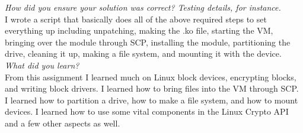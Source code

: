 \documentclass[letterpaper,10pt,titlepage]{article}
\begin{document}
\textit{How did you ensure your solution was correct? Testing details, for instance.}\\

I wrote a script that basically does all of the above required steps to set everything up including unpatching, making the .ko file, starting the VM, bringing over the module through SCP, installing the module, partitioning the drive, cleaning it up, making a file system, and mounting it with the device.\\

\textit{What did you learn?}\\

From this assignment I learned much on Linux block devices, encrypting blocks, and writing block drivers.  I learned how to bring files into the VM through SCP.  I learned how to partition a drive, how to make a file system, and how to mount devices.  I learned how to use some vital components in the Linux Crypto API and a few other aspects as well.\\
\end{document}
